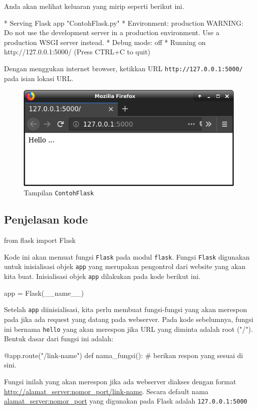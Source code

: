 \documentclass[a4paper,11pt]{extarticle}
\begin{document}
Anda akan melihat keluaran yang mirip seperti berikut ini.
\begin{textcode}
 * Serving Flask app "ContohFlask.py"
 * Environment: production
   WARNING: Do not use the development server in a production environment.
   Use a production WSGI server instead.
 * Debug mode: off
 * Running on http://127.0.0.1:5000/ (Press CTRL+C to quit)
\end{textcode}

Dengan menggukan internet browser, ketikkan URL \texttt{http://127.0.0.1:5000/}
pada isian lokasi URL.
\begin{figure}[h!]
{\centering
\includegraphics[scale=0.5]{images/Firefox_Hello_v1.png}
\par}
\caption{Tampilan \texttt{ContohFlask}}
\end{figure}

\subsection{Penjelasan kode}

\begin{pythoncode}
from flask import Flask
\end{pythoncode}

Kode ini akan memuat fungsi \texttt{Flask} pada modul \texttt{flask}.
Fungsi \texttt{Flask} digunakan untuk inisialisasi objek \texttt{app}
yang merupakan pengontrol dari website yang akan kita buat.
Inisialisasi objek \texttt{app} dilakukan pada kode berikut ini.
\begin{pythoncode}
app = Flask(__name__)
\end{pythoncode}

Setelah \texttt{app} diinisialisasi, kita perlu membuat fungsi-fungsi
yang akan merespon pada jika ada request yang datang pada webserver.
Pada kode sebelumnya, fungsi ini bernama \texttt{hello} yang akan
merespon jika URL yang diminta adalah root ("/"). Bentuk dasar dari fungsi
ini adalah:
\begin{pythoncode}
@app.route("/link-name")
def nama_fungsi():
    # berikan respon yang sesuai di sini.
\end{pythoncode}
Fungsi inilah yang akan merespon jika ada webserver diakses dengan format
\url{http://alamat_server:nomor_port/link-name}. Secara default nama
\url{alamat_server:nomor_port} yang digunakan pada Flask adalah
\texttt{127.0.0.1:5000}
\end{document}
